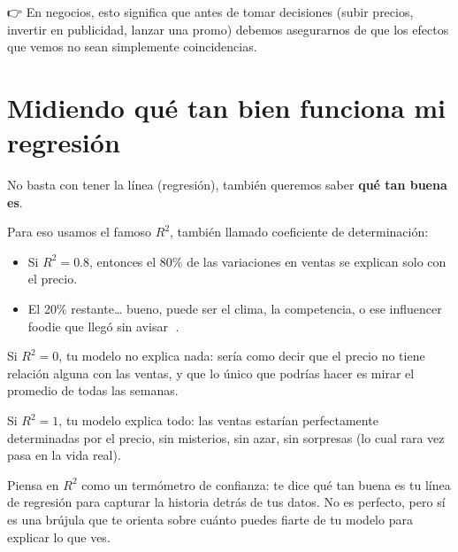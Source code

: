 \documentclass[
  spanish,
  letterpaper,
  DIV=11,
  numbers=noendperiod]{scrreprt}
\providecommand{\tightlist}{%
  \setlength{\itemsep}{0pt}\setlength{\parskip}{0pt}}
\begin{document}
👉 En negocios, esto significa que antes de tomar decisiones (subir
precios, invertir en publicidad, lanzar una promo) debemos asegurarnos
de que los efectos que vemos no sean simplemente coincidencias.

\section{Midiendo qué tan bien funciona mi
regresión}\label{midiendo-quuxe9-tan-bien-funciona-mi-regresiuxf3n}

No basta con tener la línea (regresión), también queremos saber
\textbf{qué tan buena es}.

Para eso usamos el famoso \textbf{\(R^2\)}, también llamado coeficiente
de determinación:

\begin{itemize}
\tightlist
\item
  Si \(R^2 = 0.8\), entonces el 80\% de las variaciones en ventas se
  explican solo con el precio.\\
\item
  El 20\% restante\ldots{} bueno, puede ser el clima, la competencia, o
  ese influencer foodie que llegó sin avisar 📸.
\end{itemize}

Si \(R^2 = 0\), tu modelo no explica nada: sería como decir que el
precio no tiene relación alguna con las ventas, y que lo único que
podrías hacer es mirar el promedio de todas las semanas.

Si \(R^2 = 1\), tu modelo explica todo: las ventas estarían
perfectamente determinadas por el precio, sin misterios, sin azar, sin
sorpresas (lo cual rara vez pasa en la vida real).

\begin{tcolorbox}[enhanced jigsaw, toptitle=1mm, opacitybacktitle=0.6, leftrule=.75mm, arc=.35mm, title=\textcolor{quarto-callout-tip-color}{\faLightbulb}\hspace{0.5em}{Tip}, colback=white, bottomrule=.15mm, colbacktitle=quarto-callout-tip-color!10!white, opacityback=0, bottomtitle=1mm, breakable, rightrule=.15mm, coltitle=black, left=2mm, titlerule=0mm, colframe=quarto-callout-tip-color-frame, toprule=.15mm]

Piensa en \(R^2\) como un termómetro de confianza: te dice qué tan buena
es tu línea de regresión para capturar la historia detrás de tus datos.
No es perfecto, pero sí es una brújula que te orienta sobre cuánto
puedes fiarte de tu modelo para explicar lo que ves.

\end{tcolorbox}
\end{document}
